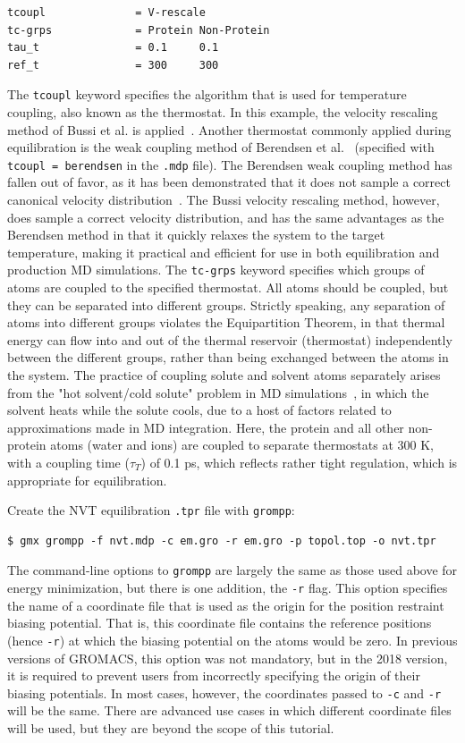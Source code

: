 \documentclass[9pt,tutorial,pubversion]{livecoms}
\begin{document}
\begin{lstlisting}
tcoupl              = V-rescale
tc-grps             = Protein Non-Protein
tau_t               = 0.1     0.1
ref_t               = 300     300
\end{lstlisting}
%
The \texttt{tcoupl} keyword specifies the algorithm that is used for temperature coupling, also known as the thermostat. In this example, the velocity rescaling method of Bussi et al. is applied~\cite{Bussi2007}. Another thermostat commonly applied during equilibration is the weak coupling method of Berendsen et al.~\cite{Berendsen1984} (specified with \texttt{tcoupl = berendsen} in the \texttt{.mdp} file). The Berendsen weak coupling method has fallen out of favor, as it has been demonstrated that it does not sample a correct canonical velocity distribution~\cite{Bussi2007}. The Bussi velocity rescaling method, however, does sample a correct velocity distribution, and has the same advantages as the Berendsen method in that it quickly relaxes the system to the target temperature, making it practical and efficient for use in both equilibration and production MD simulations. The \texttt{tc-grps} keyword specifies which groups of atoms are coupled to the specified thermostat. All atoms should be coupled, but they can be separated into different groups. Strictly speaking, any separation of atoms into different groups violates the Equipartition Theorem, in that thermal energy can flow into and out of the thermal reservoir (thermostat) independently between the different groups, rather than being exchanged between the atoms in the system. The practice of coupling solute and solvent atoms separately arises from the "hot solvent/cold solute" problem in MD simulations~\cite{Lingenheil2008}, in which the solvent heats while the solute cools, due to a host of factors related to approximations made in MD integration. Here, the protein and all other non-protein atoms (water and ions) are coupled to separate thermostats at 300 K, with a coupling time ($\tau_{T}$) of 0.1 ps, which reflects rather tight regulation, which is appropriate for equilibration.

Create the NVT equilibration \texttt{.tpr} file with \texttt{grompp}:

\begin{lstlisting}
$ gmx grompp -f nvt.mdp -c em.gro -r em.gro -p topol.top -o nvt.tpr
\end{lstlisting}
%
The command-line options to \texttt{grompp} are largely the same as those used above for energy minimization, but there is one addition, the \texttt{-r} flag. This option specifies the name of a coordinate file that is used as the origin for the position restraint biasing potential. That is, this coordinate file contains the reference positions (hence \texttt{-r}) at which the biasing potential on the atoms would be zero. In previous versions of GROMACS, this option was not mandatory, but in the 2018 version, it is required to prevent users from incorrectly specifying the origin of their biasing potentials. In most cases, however, the coordinates passed to \texttt{-c} and \texttt{-r} will be the same. There are advanced use cases in which different coordinate files will be used, but they are beyond the scope of this tutorial.
\end{document}

